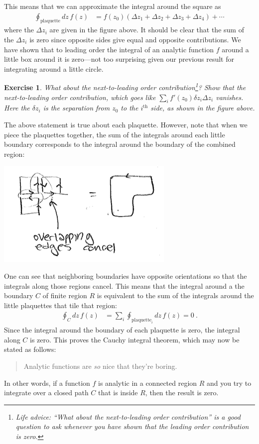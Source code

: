 \documentclass[
  11pt,
	colorful,
	raggedright,
]{tufte-style-thesis-flip}
\newtheorem{exercise}{Exercise}[section]
\begin{document}
This means that we can approximate the integral around the square as
\begin{align}
  \oint_\text{plaquette} dz\,  f(z)
  &= 
  f(z_0)
  \left(
    \Delta z_1 + \Delta z_2 + \Delta z_3 + \Delta z_4
  \right)
  + \cdots
\end{align}
where the $\Delta z_i$ are given in the figure above. It should be clear that the sum of the $\Delta z_i$ is zero since opposite sides give equal and opposite contributions. We have shown that to leading order the integral of an analytic function $f$ around a little box around it is zero---not too surprising given our previous result for integrating around a little circle. 
\begin{exercise}
What about the next-to-leading order contribution\footnote{Life advice: ``What about the next-to-leading order contribution'' is a good question to ask whenever you have shown that the leading order contribution is zero.}? Show that the next-to-leading order contribution, which goes like $\sum_i f'(z_0)\delta z_i \Delta z_i$ vanishes. Here the $\delta z_i$ is the separation from $z_0$ to the $i^\text{th}$ side, as shown in the figure above. 
\end{exercise}
The above statement is true about each plaquette. However, note that when we piece the plaquettes together, the sum of the integrals around each little boundary corresponds to the integral around the boundary of the combined region:
\begin{center}
\includegraphics[width=.4\textwidth]{figures/Lec_2017_plaqses.png}
\end{center}
One can see that neighboring boundaries have opposite orientations so that the integrals along those regions cancel. 
%
This means that the integral around a the boundary $C$ of finite region $R$ is equivalent to the sum of the integrals around the little plaquettes that tile that region:
\begin{align}
  \oint_C dz\, f(z) &= \sum_i \oint_{\text{plaquette}_i} dz\, f(z) = 0 \ .
\end{align}
Since the integral around the boundary of each plaquette is zero, the integral along $C$ is zero. This proves the Cauchy integral theorem, which may now be stated as follows:
\begin{quote}
Analytic functions are \emph{so} nice that they're boring.
\end{quote}
In other words, if a function $f$ is analytic in a connected region $R$ and you try to integrate over a closed path $C$ that is inside $R$, then the result is zero. 
\end{document}
